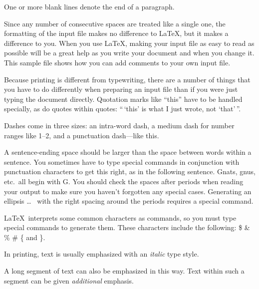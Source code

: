 One   or more   blank lines denote the  end 
of  a paragraph.  

Since any number of consecutive spaces are treated
like a single one, the formatting of the input
file makes no difference to
\LaTeX,                %
but it makes a difference to you.  When you use 
\LaTeX \cite{lamport94},  %
making your input file as easy to read
as possible will be a great help as you write 
your document and when you change it.  This sample 
file shows how you can add comments to your own input 
file.

Because printing is different from typewriting,
there are a number of things that you have to do
differently when preparing an input file than if
you were just typing the document directly.
Quotation marks like
``this'' 
have to be handled specially, as do quotes within
quotes:
``\,`this'            %
is what I just 
wrote, not  `that'\,''.  

Dashes come in three sizes: an 
intra-word 
dash, a medium dash for number ranges like 
1--2, 
and a punctuation 
dash---like 
this.

A sentence-ending space should be larger than the
space between words within a sentence.  You
sometimes have to type special commands in
conjunction with punctuation characters to get
this right, as in the following sentence.
Gnats, gnus, etc.\ all  %
begin with G\@.         %
You should check the spaces after periods when
reading your output to make sure you haven't
forgotten any special cases.  Generating an
ellipsis
\ldots\               %
%
%
with the right spacing around the periods requires
a special command.

\LaTeX\ interprets some common characters as
commands, so you must type special commands to
generate them.  These characters include the
following:
\$ \& \% \# \{ and \}.

In printing, text is usually emphasized with an
\emph{italic}  
type style.  

\begin{em}
	A long segment of text can also be emphasized 
	in this way.  Text within such a segment can be 
	given \emph{additional} emphasis.
\end{em}

